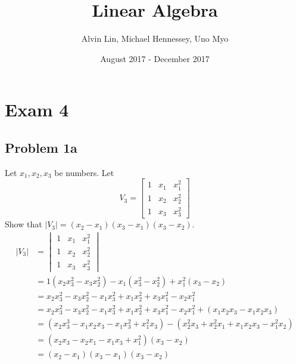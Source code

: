 \documentclass{math}
\title{Linear Algebra}
\author{Alvin Lin, Michael Hennessey, Uno Myo}
\date{August 2017 - December 2017}
\begin{document}
\maketitle

\section*{Exam 4}

\subsection*{Problem 1a}
Let \( x_1, x_2, x_3 \) be numbers. Let
\[ V_3 = \begin{bmatrix}
  1 & x_1 & x_1^2 \\
  1 & x_2 & x_2^2 \\
  1 & x_3 & x_3^2
\end{bmatrix} \]
Show that \( |V_3| = (x_2-x_1)(x_3-x_1)(x_3-x_2) \).
\begin{align*}
  |V_3| &= \begin{vmatrix}
    1 & x_1 & x_1^2 \\
    1 & x_2 & x_2^2 \\
    1 & x_3 & x_3^2
  \end{vmatrix} \\
  &= 1(x_2x_3^2-x_3x_2^2)-x_1(x_3^2-x_2^2)+x_1^2(x_3-x_2) \\
  &= x_2x_3^2-x_3x_2^2-x_1x_3^2+x_1x_2^2+x_3x_1^2-x_2x_1^2 \\
  &= x_2x_3^2-x_3x_2^2-x_1x_3^2+x_1x_2^2+x_3x_1^2-x_2x_1^2+
    (x_1x_2x_3-x_1x_2x_3) \\
  &= (x_2x_3^3-x_1x_2x_3-x_1x_3^2+x_1^2x_3)-
    (x_2^2x_3+x_2^2x_1+x_1x_2x_3-x_1^2x_2) \\
  &= (x_2x_3-x_2x_1-x_1x_3+x_1^2)(x_3-x_2) \\
  &= (x_2-x_1)(x_3-x_1)(x_3-x_2)
\end{align*}
\end{document}
